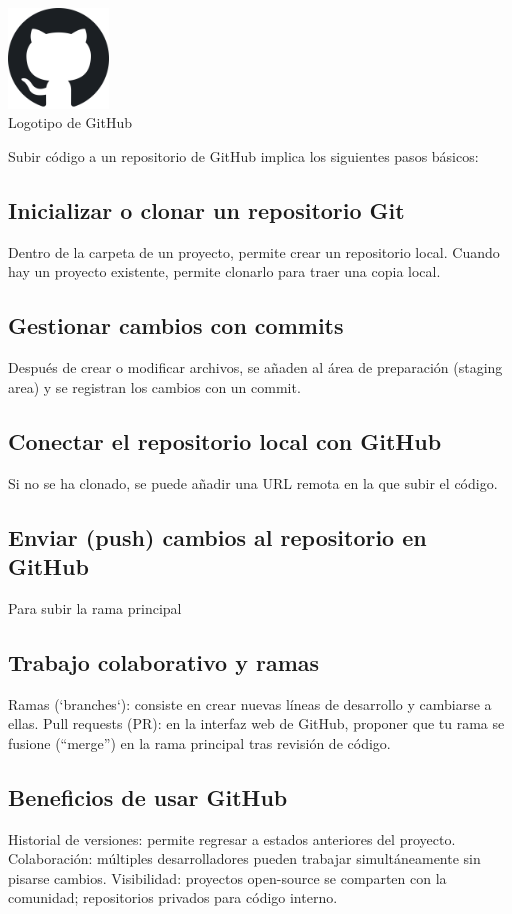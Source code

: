 \begin{center}
  \includegraphics[width=0.2\textwidth]{img/github-logo.png}\\
  \small Logotipo de GitHub
\end{center}

Subir código a un repositorio de GitHub implica los siguientes pasos básicos:

\subsection{Inicializar o clonar un repositorio Git}
Dentro de la carpeta de un proyecto, permite crear un repositorio local.
Cuando hay un proyecto existente, permite clonarlo para traer una copia local.

\subsection{Gestionar cambios con commits}
Después de crear o modificar archivos, se añaden al área de preparación (staging area) y se registran los cambios con un commit.

\subsection{Conectar el repositorio local con GitHub}
Si no se ha clonado, se puede añadir una URL remota en la que subir el código.

\subsection{Enviar (push) cambios al repositorio en GitHub}
Para subir la rama principal

\subsection{Trabajo colaborativo y ramas}
Ramas (`branches`): consiste en crear nuevas líneas de desarrollo y cambiarse a ellas.
Pull requests (PR): en la interfaz web de GitHub, proponer que tu rama se fusione (“merge”) en la rama principal tras revisión de código.

\subsection{Beneficios de usar GitHub}
Historial de versiones: permite regresar a estados anteriores del proyecto.
Colaboración: múltiples desarrolladores pueden trabajar simultáneamente sin pisarse cambios.
Visibilidad: proyectos open-source se comparten con la comunidad; repositorios privados para código interno.

